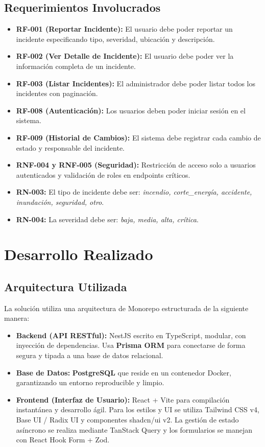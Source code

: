 \documentclass[11pt,a4paper]{article}
\begin{document}
\subsection{Requerimientos Involucrados}
\begin{itemize}
    \item \textbf{RF-001 (Reportar Incidente):} El usuario debe poder reportar un incidente especificando tipo, severidad, ubicación y descripción.
    \item \textbf{RF-002 (Ver Detalle de Incidente):} El usuario debe poder ver la información completa de un incidente.
    \item \textbf{RF-003 (Listar Incidentes):} El administrador debe poder listar todos los incidentes con paginación.
    \item \textbf{RF-008 (Autenticación):} Los usuarios deben poder iniciar sesión en el sistema.
    \item \textbf{RF-009 (Historial de Cambios):} El sistema debe registrar cada cambio de estado y responsable del incidente.
    \item \textbf{RNF-004 y RNF-005 (Seguridad):} Restricción de acceso solo a usuarios autenticados y validación de roles en endpoints críticos.
    \item \textbf{RN-003:} El tipo de incidente debe ser: \textit{incendio, corte\_energía, accidente, inundación, seguridad, otro}.
    \item \textbf{RN-004:} La severidad debe ser: \textit{baja, media, alta, crítica}.
\end{itemize}

\section{Desarrollo Realizado}
\subsection{Arquitectura Utilizada}
La solución utiliza una arquitectura de Monorepo estructurada de la siguiente manera:
\begin{itemize}
    \item \textbf{Backend (API RESTful):} NestJS escrito en TypeScript, modular, con inyección de dependencias. Usa \textbf{Prisma ORM} para conectarse de forma segura y tipada a una base de datos relacional.
    \item \textbf{Base de Datos:} \textbf{PostgreSQL} que reside en un contenedor Docker, garantizando un entorno reproducible y limpio.
    \item \textbf{Frontend (Interfaz de Usuario):} React + Vite para compilación instantánea y desarrollo ágil. Para los estilos y UI se utiliza Tailwind CSS v4, Base UI / Radix UI y componentes shadcn/ui v2. La gestión de estado asíncrono se realiza mediante TanStack Query y los formularios se manejan con React Hook Form + Zod.
\end{itemize}
\end{document}

